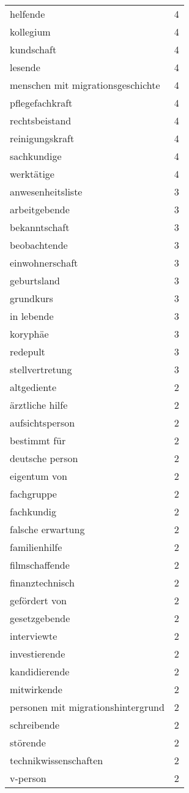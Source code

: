 \begin{tabular}{ll}
helfende & 4\\
kollegium & 4\\
kundschaft & 4\\
lesende & 4\\
menschen mit migrationsgeschichte & 4\\
pflegefachkraft & 4\\
rechtsbeistand & 4\\
reinigungskraft & 4\\
sachkundige & 4\\
werktätige & 4\\
anwesenheitsliste & 3\\
arbeitgebende & 3\\
bekanntschaft & 3\\
beobachtende & 3\\
einwohnerschaft & 3\\
geburtsland & 3\\
grundkurs & 3\\
in lebende & 3\\
koryphäe & 3\\
redepult & 3\\
stellvertretung & 3\\
altgediente & 2\\
ärztliche hilfe & 2\\
aufsichtsperson & 2\\
bestimmt für & 2\\
deutsche person & 2\\
eigentum von & 2\\
fachgruppe & 2\\
fachkundig & 2\\
falsche erwartung & 2\\
familienhilfe & 2\\
filmschaffende & 2\\
finanztechnisch & 2\\
gefördert von & 2\\
gesetzgebende & 2\\
interviewte & 2\\
investierende & 2\\
kandidierende & 2\\
mitwirkende & 2\\
personen mit migrationshintergrund & 2\\
schreibende & 2\\
störende & 2\\
technikwissenschaften & 2\\
v-person & 2\\

\end{tabular}
